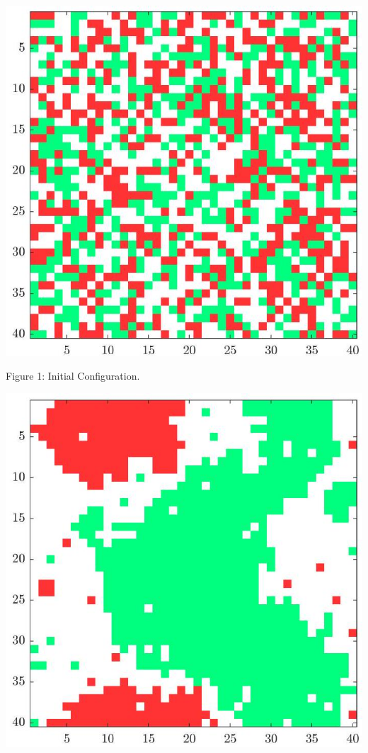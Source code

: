 \documentclass[12pt]{article}
\begin{document}
\begin{center}
\includegraphics[max width=\textwidth]{2024_03_02_8c82830fbe70d4921a9fg-4(1)}
\end{center}

Figure 1: Initial Configuration.

\begin{center}
\includegraphics[max width=\textwidth]{2024_03_02_8c82830fbe70d4921a9fg-4}
\end{center}
\end{document}
